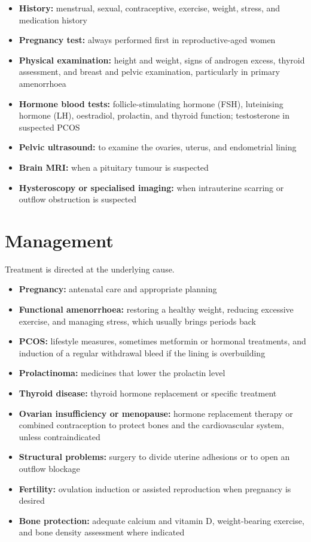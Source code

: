 \begin{itemize}
    \item \textbf{History:} menstrual, sexual, contraceptive, exercise, weight, stress, and medication history
    \item \textbf{Pregnancy test:} always performed first in reproductive-aged women
    \item \textbf{Physical examination:} height and weight, signs of androgen excess, thyroid assessment, and breast and pelvic examination, particularly in primary amenorrhoea
    \item \textbf{Hormone blood tests:} follicle-stimulating hormone (FSH), luteinising hormone (LH), oestradiol, prolactin, and thyroid function; testosterone in suspected PCOS
    \item \textbf{Pelvic ultrasound:} to examine the ovaries, uterus, and endometrial lining
    \item \textbf{Brain MRI:} when a pituitary tumour is suspected
    \item \textbf{Hysteroscopy or specialised imaging:} when intrauterine scarring or outflow obstruction is suspected
\end{itemize}

\section*{Management}
Treatment is directed at the underlying cause.

\begin{itemize}
    \item \textbf{Pregnancy:} antenatal care and appropriate planning
    \item \textbf{Functional amenorrhoea:} restoring a healthy weight, reducing excessive exercise, and managing stress, which usually brings periods back
    \item \textbf{PCOS:} lifestyle measures, sometimes metformin or hormonal treatments, and induction of a regular withdrawal bleed if the lining is overbuilding
    \item \textbf{Prolactinoma:} medicines that lower the prolactin level
    \item \textbf{Thyroid disease:} thyroid hormone replacement or specific treatment
    \item \textbf{Ovarian insufficiency or menopause:} hormone replacement therapy or combined contraception to protect bones and the cardiovascular system, unless contraindicated
    \item \textbf{Structural problems:} surgery to divide uterine adhesions or to open an outflow blockage
    \item \textbf{Fertility:} ovulation induction or assisted reproduction when pregnancy is desired
    \item \textbf{Bone protection:} adequate calcium and vitamin D, weight-bearing exercise, and bone density assessment where indicated
\end{itemize}

